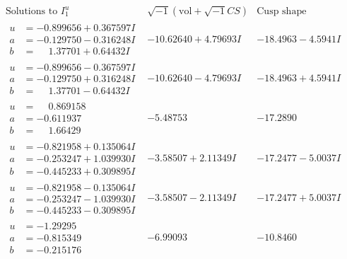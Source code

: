 \documentclass[1p]{elsarticle_modified}
\theoremstyle{definition}
\newcommand{\I}{\sqrt{-1}}
\begin{document}
$$\begin{array}{c|c|c}  
\text{Solutions to }I^u_{1}& \I (\text{vol} + \sqrt{-1}CS) & \text{Cusp shape}\\
 \hline 
\begin{aligned}
u &= -0.899656 + 0.367597 I \\
a &= -0.129750 - 0.316248 I \\
b &= \phantom{-}1.37701 + 0.64432 I\end{aligned}
 & -10.62640 + 4.79693 I & -18.4963 - 4.5941 I \\ \hline\begin{aligned}
u &= -0.899656 - 0.367597 I \\
a &= -0.129750 + 0.316248 I \\
b &= \phantom{-}1.37701 - 0.64432 I\end{aligned}
 & -10.62640 - 4.79693 I & -18.4963 + 4.5941 I \\ \hline\begin{aligned}
u &= \phantom{-}0.869158\phantom{ +0.000000I} \\
a &= -0.611937\phantom{ +0.000000I} \\
b &= \phantom{-}1.66429\phantom{ +0.000000I}\end{aligned}
 & -5.48753\phantom{ +0.000000I} & -17.2890\phantom{ +0.000000I} \\ \hline\begin{aligned}
u &= -0.821958 + 0.135064 I \\
a &= -0.253247 + 1.039930 I \\
b &= -0.445233 + 0.309895 I\end{aligned}
 & -3.58507 + 2.11349 I & -17.2477 - 5.0037 I \\ \hline\begin{aligned}
u &= -0.821958 - 0.135064 I \\
a &= -0.253247 - 1.039930 I \\
b &= -0.445233 - 0.309895 I\end{aligned}
 & -3.58507 - 2.11349 I & -17.2477 + 5.0037 I \\ \hline\begin{aligned}
u &= -1.29295\phantom{ +0.000000I} \\
a &= -0.815349\phantom{ +0.000000I} \\
b &= -0.215176\phantom{ +0.000000I}\end{aligned}
 & -6.99093\phantom{ +0.000000I} & -10.8460\phantom{ +0.000000I} \\ \hline\begin{aligned}

\end{aligned}
\end{array}$$
\end{document}
